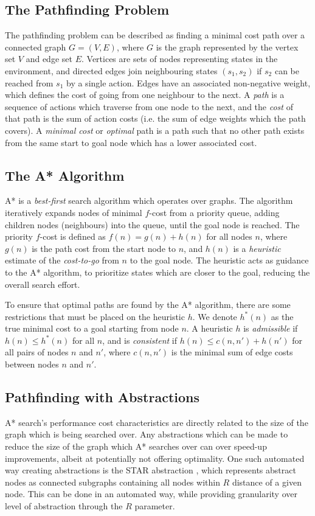 \documentclass[letterpaper]{article} %
\begin{document}
\subsection*{The Pathfinding Problem}
The pathfinding problem can be described as finding a minimal cost path over a connected graph $G=(V,E)$,
where $G$ is the graph represented by the vertex set $V$ and edge set $E$.
Vertices are sets of nodes representing states in the environment,
and directed edges join neighbouring states $(s_1, s_2)$ if $s_2$ can be reached from $s_1$ by a single action.
Edges have an associated non-negative weight, which defines the cost of going from one neighbour to the next.
A \textit{path} is a sequence of actions which traverse from one node to the next,
and the \textit{cost} of that path is the sum of action costs (i.e. the sum of edge weights which the path covers).
A \textit{minimal cost} or \textit{optimal} path is a path such that no other path exists from the same start to goal node
which has a lower associated cost.

\subsection{The A* Algorithm}
A* \cite{hart1968formal} is a \textit{best-first} search algorithm which operates over graphs. 
The algorithm iteratively expands nodes of minimal $f$-cost from a priority queue,
adding children nodes (neighbours) into the queue,
until the goal node is reached.
The priority $f$-cost is defined as $f(n) = g(n) + h(n)$ for all nodes $n$,
where $g(n)$ is the path cost from the start node to $n$,
and $h(n)$ is a \textit{heuristic} estimate of the \textit{cost-to-go} from $n$ to the goal node.
The heuristic acts as guidance to the A* algorithm,
to prioritize states which are closer to the goal, reducing the overall search effort.

To ensure that optimal paths are found by the A* algorithm, 
there are some restrictions that must be placed on the heuristic $h$.
We denote $h^*(n)$ as the true minimal cost to a goal starting from node $n$.
A heuristic $h$ is \textit{admissible} if $h(n) \le h^*(n)$ for all $n$,
and is \textit{consistent} if $h(n) \le c(n, n') + h(n')$ for all pairs of nodes $n$ and $n'$,
where $c(n, n')$ is the minimal sum of edge costs between nodes $n$ and $n'$.

\subsection*{Pathfinding with Abstractions}
A* search's performance cost characteristics are directly related to the size of the graph which is being searched over.
Any abstractions which can be made to reduce the size of the graph which A* searches over can over speed-up improvements,
albeit at potentially not offering optimality.
One such automated way creating abstractions is the STAR abstraction \cite{holte1996speeding},
which represents abstract nodes as connected subgraphs containing all nodes within $R$ distance of a given node.
This can be done in an automated way, while providing granularity over level of abstraction through the $R$ parameter.
\end{document}
